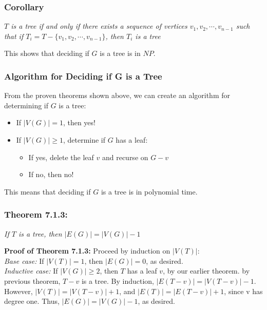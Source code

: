 \documentclass{report}
\begin{document}
\subsubsection{Corollary}
\begin{center}
\textit{$T$ is a tree if and only if there exists a sequence of vertices $v_1,v_2,\cdots,v_{n-1}$ such that if $T_i = T - \{v_1,v_2,\cdots,v_{n-1}\}$, then $T_i$ is a tree}
\end{center}
This shows that deciding if $G$ is a tree is in $NP$.
\subsubsection{Algorithm for Deciding if G is a Tree}
From the proven theorems shown above, we can create an algorithm for determining if $G$ is a tree:
\begin{itemize}
\item If $\vert V(G) \vert = 1$, then yes!
\item If $\vert V(G) \vert \geq 1$, determine if $G$ has a leaf:
\begin{itemize}
\item If yes, delete the leaf $v$ and recurse on $G-v$
\item If no, then no!
\end{itemize}
\end{itemize}
This means that deciding if $G$ is a tree is in polynomial time.
\subsubsection{Theorem 7.1.3:}
\begin{center}
\textit{If $T$ is a tree, then $\vert E(G) \vert = \vert V(G) \vert - 1$}
\end{center}
\textbf{Proof of Theorem 7.1.3:} Proceed by induction on $\vert V(T) \vert$:\\
\textit{Base case:} If $\vert V(T) \vert = 1$, then $\vert E(G) \vert = 0$, as desired.\\
\textit{Inductive case:} If $\vert V(G) \vert \geq 2$, then $T$ has a leaf $v$, by our earlier theorem. by previous theorem, $T-v$ is a tree.
By induction, $\vert E(T-v)\vert = \vert V(T-v)\vert - 1$. However, $|V(T)| = |V(T-v)| + 1$, and $\vert E(T)\vert = \vert E(T-v)\vert + 1$, since v has degree one. Thus, $\vert E(G) \vert = \vert V(G) \vert - 1$, as desired.
\end{document}
